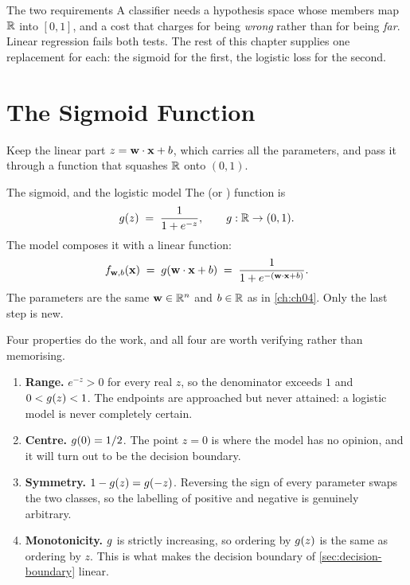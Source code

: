 \begin{keyinsight}{The two requirements}
A classifier needs a hypothesis space whose members map $\mathbb{R}$ into $[0,1]$, and a
cost that charges for being \emph{wrong} rather than for being \emph{far}. Linear
regression fails both tests. The rest of this chapter supplies one replacement
for each: the sigmoid for the first, the logistic loss for the second.
\end{keyinsight}

\section{The Sigmoid Function}
\label{sec:sigmoid}

Keep the linear part $z = \mathbf{w}\cdot\mathbf{x} + b$, which carries all the parameters, and
pass it through a function that squashes $\mathbb{R}$ onto $(0,1)$.

\begin{defbox}{The sigmoid, and the logistic model}
The  (or ) function is
\[
  g(z) \;=\; \frac{1}{1+e^{-z}}, \qquad g:\mathbb{R} \to (0,1).
\]
The  model composes it with a linear function:
\[
  f_{\mathbf{w},b}(\mathbf{x}) \;=\; g(\mathbf{w}\cdot\mathbf{x} + b) \;=\; \frac{1}{1+e^{-(\mathbf{w}\cdot\mathbf{x}+b)}} .
\]
The parameters are the same $\mathbf{w} \in \mathbb{R}^{n}$ and $b \in \mathbb{R}$ as in
\cref{ch:ch04}. Only the last step is new.
\end{defbox}

Four properties do the work, and all four are worth verifying rather than
memorising.

\begin{enumerate}
  \item \textbf{Range.} $e^{-z} > 0$ for every real $z$, so the denominator
        exceeds $1$ and $0 < g(z) < 1$. The endpoints are approached but
        never attained: a logistic model is never completely certain.
  \item \textbf{Centre.} $g(0) = 1/2$. The point $z = 0$ is where the model
        has no opinion, and it will turn out to be the decision boundary.
  \item \textbf{Symmetry.} $1 - g(z) = g(-z)$. Reversing the sign of
        every parameter swaps the two classes, so the labelling of positive and
        negative is genuinely arbitrary.
  \item \textbf{Monotonicity.} $g$ is strictly increasing, so ordering by
        $g(z)$ is the same as ordering by $z$. This is what makes the
        decision boundary of \cref{sec:decision-boundary} linear.
\end{enumerate}

